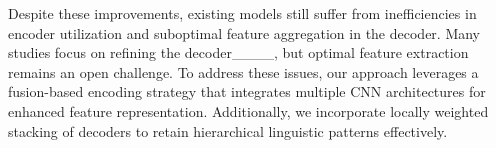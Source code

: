 Despite these improvements, existing models still suffer from inefficiencies in encoder utilization and suboptimal feature aggregation in the decoder. Many studies focus on refining the decoder____, but optimal feature extraction remains an open challenge. To address these issues, our approach leverages a fusion-based encoding strategy that integrates multiple CNN architectures for enhanced feature representation. Additionally, we incorporate locally weighted stacking of decoders to retain hierarchical linguistic patterns effectively.